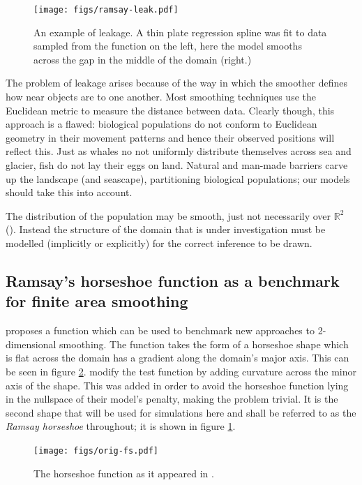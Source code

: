 \documentclass[10pt]{article}
\begin{document}
\begin{figure}
\centering
\texttt{[image: figs/ramsay-leak.pdf]}\\
\caption{An example of leakage. A thin plate regression spline was fit to data sampled from the function on the left, here the model smooths across the gap in the middle of the domain (right.)}
\label{leakage}
\end{figure}

The problem of leakage arises because of the way in which the smoother defines how near objects are to one another. Most smoothing techniques use the Euclidean metric to measure the distance between data. Clearly though, this approach is a flawed: biological populations do not conform to Euclidean geometry in their movement patterns and hence their observed positions will reflect this. Just as whales no not uniformly distribute themselves across sea and glacier, fish do not lay their eggs on land. Natural and man-made barriers carve up the landscape (and seascape), partitioning biological populations; our models should take this into account.

The distribution of the population may be smooth, just not necessarily over $\mathbb{R}^2$ (\cite{wangranalli}). Instead the structure of the domain that is under investigation must be modelled (implicitly or explicitly) for the correct inference to be drawn.

\subsection{Ramsay's horseshoe function as a benchmark for finite area smoothing}

\label{ramsayfunc}

\cite{ramsay} proposes a function which can be used to benchmark new approaches to 2-dimensional smoothing. The function takes the form of a horseshoe shape which is flat across the domain has a gradient along the domain's major axis. This can be seen in figure \ref{orig-fs}. \cite{soap} modify the test function by adding curvature across the minor axis of the shape. This was added in order to avoid the horseshoe function lying in the nullspace of their model's penalty, making the problem trivial. It is the second shape that will be used for simulations here and shall be referred to as the \emph{Ramsay horseshoe} throughout; it is shown in figure \ref{leakage}.

\begin{figure}
\centering
\texttt{[image: figs/orig-fs.pdf]}\\
\caption{The horseshoe function as it appeared in \cite{ramsay}.}
\label{orig-fs}
\end{figure}
\end{document}
